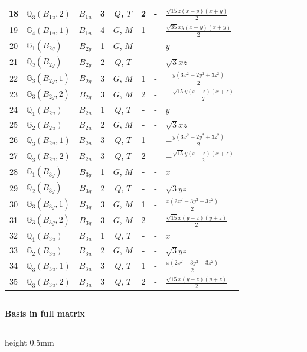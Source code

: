 \documentclass[fleqn,10pt,landscape]{jsarticle}
\begin{document}
\begin{longtable}[l]{clcccccl}
18 & $\mathbb{Q}_{3}(B_{1u},2)$ & $B_{1u}$ & 3 & $Q$, $T$ & 2 & - & $\frac{\sqrt{15} z \left(x - y\right) \left(x + y\right)}{2}$ \\ \hline
19 & $\mathbb{G}_{4}(B_{1u},1)$ & $B_{1u}$ & 4 & $G$, $M$ & 1 & - & $\frac{\sqrt{35} x y \left(x - y\right) \left(x + y\right)}{2}$ \\ \hline
20 & $\mathbb{G}_{1}(B_{2g})$ & $B_{2g}$ & 1 & $G$, $M$ & - & - & $y$ \\ \hline
21 & $\mathbb{Q}_{2}(B_{2g})$ & $B_{2g}$ & 2 & $Q$, $T$ & - & - & $\sqrt{3} x z$ \\ \hline
22 & $\mathbb{G}_{3}(B_{2g},1)$ & $B_{2g}$ & 3 & $G$, $M$ & 1 & - & $- \frac{y \left(3 x^{2} - 2 y^{2} + 3 z^{2}\right)}{2}$ \\ \hline
23 & $\mathbb{G}_{3}(B_{2g},2)$ & $B_{2g}$ & 3 & $G$, $M$ & 2 & - & $- \frac{\sqrt{15} y \left(x - z\right) \left(x + z\right)}{2}$ \\ \hline
24 & $\mathbb{Q}_{1}(B_{2u})$ & $B_{2u}$ & 1 & $Q$, $T$ & - & - & $y$ \\ \hline
25 & $\mathbb{G}_{2}(B_{2u})$ & $B_{2u}$ & 2 & $G$, $M$ & - & - & $\sqrt{3} x z$ \\ \hline
26 & $\mathbb{Q}_{3}(B_{2u},1)$ & $B_{2u}$ & 3 & $Q$, $T$ & 1 & - & $- \frac{y \left(3 x^{2} - 2 y^{2} + 3 z^{2}\right)}{2}$ \\ \hline
27 & $\mathbb{Q}_{3}(B_{2u},2)$ & $B_{2u}$ & 3 & $Q$, $T$ & 2 & - & $- \frac{\sqrt{15} y \left(x - z\right) \left(x + z\right)}{2}$ \\ \hline
28 & $\mathbb{G}_{1}(B_{3g})$ & $B_{3g}$ & 1 & $G$, $M$ & - & - & $x$ \\ \hline
29 & $\mathbb{Q}_{2}(B_{3g})$ & $B_{3g}$ & 2 & $Q$, $T$ & - & - & $\sqrt{3} y z$ \\ \hline
30 & $\mathbb{G}_{3}(B_{3g},1)$ & $B_{3g}$ & 3 & $G$, $M$ & 1 & - & $\frac{x \left(2 x^{2} - 3 y^{2} - 3 z^{2}\right)}{2}$ \\ \hline
31 & $\mathbb{G}_{3}(B_{3g},2)$ & $B_{3g}$ & 3 & $G$, $M$ & 2 & - & $\frac{\sqrt{15} x \left(y - z\right) \left(y + z\right)}{2}$ \\ \hline
32 & $\mathbb{Q}_{1}(B_{3u})$ & $B_{3u}$ & 1 & $Q$, $T$ & - & - & $x$ \\ \hline
33 & $\mathbb{G}_{2}(B_{3u})$ & $B_{3u}$ & 2 & $G$, $M$ & - & - & $\sqrt{3} y z$ \\ \hline
34 & $\mathbb{Q}_{3}(B_{3u},1)$ & $B_{3u}$ & 3 & $Q$, $T$ & 1 & - & $\frac{x \left(2 x^{2} - 3 y^{2} - 3 z^{2}\right)}{2}$ \\ \hline
35 & $\mathbb{Q}_{3}(B_{3u},2)$ & $B_{3u}$ & 3 & $Q$, $T$ & 2 & - & $\frac{\sqrt{15} x \left(y - z\right) \left(y + z\right)}{2}$ \\
\end{longtable}
\vspace{5mm}
\noindent \rule[0.5mm]{5mm}{0.5mm}\hspace{3mm}\textbf{Basis in full matrix}\hspace{3mm}\leaders\hrule height 0.5mm\hfill\kern0pt
\vspace{3mm}
\end{document}

